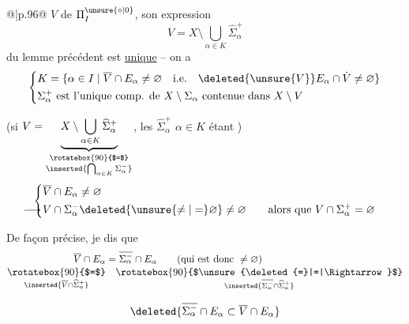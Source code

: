 \noindent\begin{tabular}{@{}|p{.96\linewidth}@{}}
$V$ de $\Pi_I^{\unsure{\circ|0}}$, son expression
\[
V=X\setminus\bigcup_{\alpha\in K}\widehat{\Sigma}_\alpha^+
\]
du lemme précédent est \uline{unique} -- on a
{\small
\[
\left\{\begin{aligned}
&K=\{\alpha\in I\mid\overline V\cap E_\alpha\ne\varnothing\quad\text{i.e.}\quad\deleted{\unsure{V}}E_\alpha\cap\dot V\ne\varnothing\}\\
&\Sigma_\alpha^+\ \text{est l'unique comp. de }X\setminus\Sigma_\alpha\ \text{contenue dans }X\setminus V
\end{aligned}\right.
\]}
\end{tabular}
   (si $V=\underset{\substack{\rotatebox{90}{$=$}\\ \inserted{\bigcap_{\alpha\in K}\Sigma_\alpha^-}}}{\underbrace{X\setminus\bigcup_{\alpha\in K}\widehat{\Sigma}_\alpha^+}}$, les $\widehat{\Sigma}_\alpha^+$ \unsure{(}$\alpha\in K$ étant )
\[
\left\{\begin{aligned}
&\overline V\cap E_\alpha\ne\varnothing\\
&\makebox[0pt][r]{$\longrightarrow$\hspace{.15em}}V\cap\Sigma_\alpha^-\deleted{\unsure{\ne|=}\varnothing}\ne\varnothing
\qquad\text{alors que } V\cap\Sigma_\alpha^+=\varnothing
\end{aligned}\right.
\]
\reversemarginpar{}\normalmarginpar

De façon précise, je dis que
\[
\begin{aligned}
\overline V\cap E_\alpha & = \overline{\Sigma_\alpha^-}\cap E_\alpha\qquad\text{(qui est donc }\ne\varnothing\text{)}\\[-2pt]
\underset{\inserted{\overline V\cap\widehat{\Sigma}_\alpha^+}}{\rotatebox{90}{$=$}}&
\hspace{1em}\underset{\inserted{\overline{\Sigma_\alpha^-}\cap\widehat{\Sigma}_\alpha^+}}{\rotatebox{90}{$\unsure{\deleted{=}|=|\Rightarrow}$}}
\end{aligned}
\]

\[
\deleted{\overline{\Sigma_\alpha^-}\cap E_\alpha\subset\overline V\cap E_\alpha}
\]

